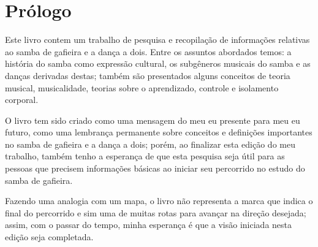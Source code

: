 
\cleardoublepage %
\newpage
\thispagestyle{empty}

\chapter*{Prólogo}
Este livro contem um trabalho de pesquisa e recopilação de informações relativas ao samba de gafieira
e a dança a dois. Entre os assuntos abordados temos: a história do samba como expressão cultural,
os subgêneros musicais do samba e as danças derivadas destas; 
também são presentados alguns conceitos de teoria musical,
musicalidade, teorias sobre o aprendizado, controle e isolamento corporal.  

O livro tem sido criado como uma mensagem do meu eu presente para meu eu futuro,
como uma lembrança permanente sobre conceitos e definições importantes no samba de gafieira e a dança a dois;
porém, ao finalizar esta edição do meu trabalho, 
também tenho a esperança de que esta pesquisa seja útil para as pessoas
que precisem informações básicas ao iniciar seu percorrido no estudo do samba de gafieira.

Fazendo uma analogia com um mapa, 
o livro não representa a marca que indica o final do percorrido 
e sim uma de muitas rotas para avançar na direção desejada;
assim, com o passar do tempo, minha esperança é que a visão iniciada nesta edição seja completada.  
